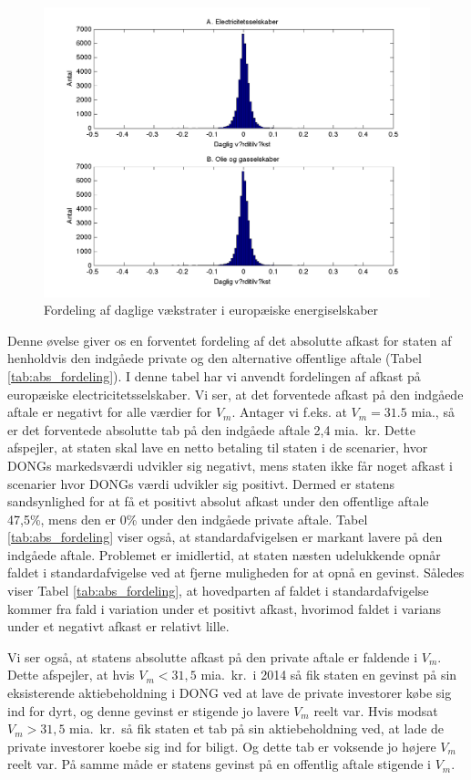 \documentclass{article}
\begin{document}
\begin{figure}
\includegraphics[scale=0.8]{../matlab/figs/data_hist}
\caption{Fordeling af daglige v\ae{}kstrater i europ\ae{}iske energiselskaber}
\label{fig:data_hist}
\end{figure}

Denne øvelse giver os en forventet fordeling af det absolutte afkast for staten af henholdvis den indgåede private og den alternative offentlige aftale (Tabel \ref{tab:abs_fordeling}). I denne tabel har vi anvendt fordelingen af afkast på europæiske electricitetsselskaber. Vi ser, at det forventede afkast på den indgåede aftale er negativt for alle værdier for $V_m$. Antager vi f.eks. at $V_m=31.5$ mia., så er det forventede absolutte tab på den indgåede aftale 2,4 mia.\ kr. Dette afspejler, at staten skal lave en netto betaling til staten i de scenarier, hvor DONGs markedsværdi udvikler sig negativt, mens staten ikke får noget afkast i scenarier hvor DONGs værdi udvikler sig positivt. Dermed er statens sandsynlighed for at få et positivt absolut afkast under den offentlige aftale 47,5\%, mens den er 0\% under den indgåede private aftale. Tabel \ref{tab:abs_fordeling} viser også, at standardafvigelsen er markant lavere på den indgåede aftale. Problemet er imidlertid, at staten næsten udelukkende opnår faldet i standardafvigelse ved at fjerne muligheden for at opnå en gevinst. Således viser Tabel \ref{tab:abs_fordeling}, at hovedparten af faldet i standardafvigelse kommer fra fald i variation under et positivt afkast, hvorimod faldet i varians under et negativt afkast er relativt lille.

Vi ser også, at statens absolutte afkast på den private aftale er faldende i $V_m$. Dette afspejler, at hvis $V_m<31,5$ mia.\ kr.\ i 2014 så fik staten en gevinst på sin eksisterende aktiebeholdning i DONG ved at lave de private investorer købe sig ind for dyrt, og denne gevinst er stigende jo lavere $V_m$ reelt var. Hvis modsat $V_m>31,5$ mia.\ kr.\, så fik staten et tab på sin aktiebeholdning ved, at lade de private investorer koebe sig ind for biligt. Og dette tab er voksende jo højere $V_m$ reelt var. På samme måde er statens gevinst på en offentlig aftale stigende i $V_m$.
\end{document}
